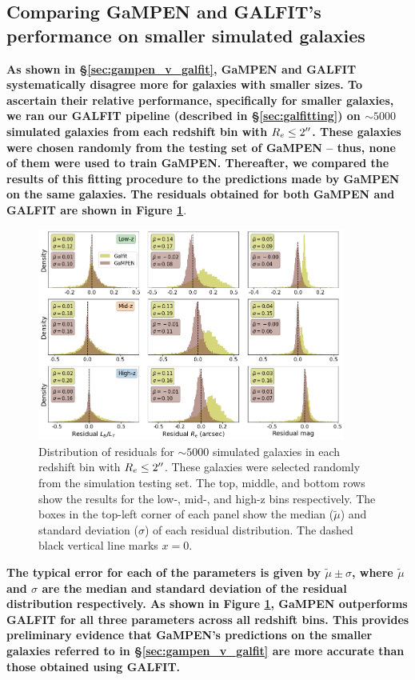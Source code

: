 \documentclass[linenumbers,twocolumn,twocolappendix]{aastex631}
\newcommand\gampen{GaMPEN}
\begin{document}
\begin{CJK*}{UTF8}{gbsn}
\section{Comparing \gampen{} and GALFIT's performance on smaller simulated galaxies} \label{ap:sec:gapemn_v_galfit}

\textbf{As shown in \S \ref{sec:gampen_v_galfit}, GaMPEN and GALFIT systematically disagree more for galaxies with smaller sizes. To ascertain their relative performance, specifically for smaller galaxies, we ran our GALFIT pipeline (described in \S \ref{sec:galfitting}) on $\sim5000$ simulated galaxies from each redshift bin with $R_e \leq 2\mbox{$^{\prime\prime}$}$. These galaxies were chosen randomly from the testing set of \gampen{} -- thus, none of them were used to train \gampen{}. Thereafter, we compared the results of this fitting procedure to the predictions made by \gampen{} on the same galaxies. The residuals obtained for both \gampen{} and GALFIT are shown in Figure \ref{fig:gampen_v_galfit}}.

\begin{figure}[htb]
    \centering
    \includegraphics[width = 0.9\textwidth]{gampen_v_galfit.png}
    \caption{Distribution of residuals for $\sim5000$ simulated galaxies in each redshift bin with $R_e \leq 2\mbox{$^{\prime\prime}$}$.  These galaxies were selected randomly from the simulation testing set. The top, middle, and bottom rows show the results for the low-, mid-, and high-z bins respectively. The boxes in the top-left corner of each panel show the median ($\tilde{\mu}$) and standard deviation ($\sigma$) of each residual distribution. The dashed black vertical line marks $x=0$. }
    \label{fig:gampen_v_galfit}
\end{figure}

\textbf{The typical error for each of the parameters is given by $\tilde{\mu}\pm\sigma$, where $\tilde{\mu}$ and $\sigma$ are the median and standard deviation of the residual distribution respectively. As shown in Figure \ref{fig:gampen_v_galfit}, \gampen{} outperforms GALFIT for all three parameters across all redshift bins. This provides preliminary evidence that \gampen{}'s predictions on the smaller galaxies referred to in \S \ref{sec:gampen_v_galfit} are more accurate than those obtained using GALFIT.}



\end{CJK*}
\end{document}
